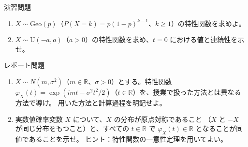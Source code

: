 \documentclass[a4paper,10pt,pdflatex,ja=standard,jafont=ipaex-type1,
  magstyle=real,scale=1]{bxjsarticle}
\newcommand{\topic}[1]{\par\vspace{5pt}
  {\large\sffamily\mdseries\color{accent}#1}\par\vspace{2pt}}
\newcommand{\R}{\mathbb R}
\begin{document}
\topic{演習問題}
\begin{enumerate}[label=\arabic*.]
\item $X\sim\mathrm{Geo}(p)$（$P(X=k)=p(1-p)^{k-1}$、$k\ge1$）の特性関数を求めよ。
\item $X\sim\mathrm U(-a,a)$（$a>0$）の特性関数を求め、$t=0$ における値と連続性を示せ。
\end{enumerate}

\topic{レポート問題}
\begin{enumerate}[label=\arabic*.]
\item $X\sim N(m,\sigma^2)$（$m\in\R$、$\sigma>0$）とする。特性関数
$\varphi_X(t)=\exp(imt-\sigma^2t^2/2)$（$t\in\R$）を、授業で扱った方法とは異なる方法で導け。
用いた方法と計算過程を明記せよ。
\item 実数値確率変数 $X$ について、$X$ の分布が原点対称であること
（$X$ と $-X$ が同じ分布をもつこと）と、すべての $t\in\R$ で
$\varphi_X(t)\in\R$ となることが同値であることを示せ。
ヒント：特性関数の一意性定理を用いてよい。
\end{enumerate}
\end{document}
